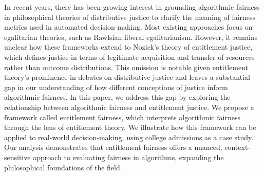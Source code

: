 In recent years, there has been growing interest in grounding algorithmic
fairness in philosophical theories of distributive justice to clarify the
meaning of fairness metrics used in automated decision-making. Most existing
approaches focus on egalitarian theories, such as Rawlsian liberal
egalitarianism. However, it remains unclear how these frameworks extend to
Nozick’s theory of entitlement justice, which defines justice in terms of
legitimate acquisition and transfer of resources rather than outcome
distributions. This omission is notable given entitlement theory’s prominence in
debates on distributive justice and leaves a substantial gap in our
understanding of how different conceptions of justice inform algorithmic
fairness. In this paper, we address this gap by exploring the relationship
between algorithmic fairness and entitlement justice. We propose a framework
called entitlement fairness, which interprets algorithmic fairness through the
lens of entitlement theory. We illustrate how this framework can be applied to
real-world decision-making, using college admissions as a case study. Our
analysis demonstrates that entitlement fairness offers a nuanced,
context-sensitive approach to evaluating fairness in algorithms, expanding the
philosophical foundations of the field.